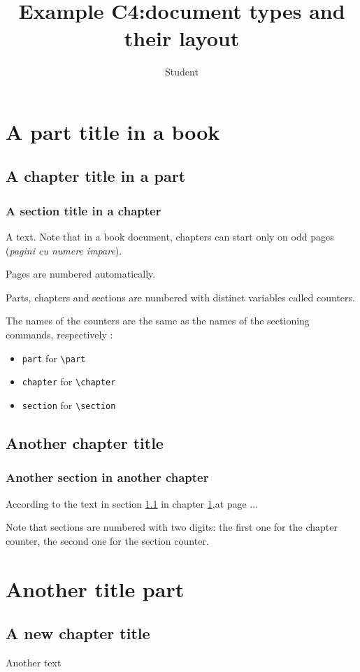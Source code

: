 \documentclass{book}
\title{Example C4:document types and their layout }
\author{Student}
\begin{document}
\maketitle
\tableofcontents
\part{A part title in a book}
\chapter{A chapter title in a part}\label{cha:et}
\section{A section title in a chapter}\label{sec:et}
A text. Note that in a book document, chapters can start only on odd pages (\emph{pagini cu numere impare}).\par
Pages are numbered automatically.\par
Parts, chapters and sections are numbered with distinct variables called counters.\par
The names of the counters are the same as the names of the sectioning commands, respectively :
\begin{itemize}
\item \verb+part+ for \verb+\part+
\item \verb+chapter+ for \verb+\chapter+
\item \verb+section+ for \verb+\section+
\end{itemize}
\chapter{Another chapter title}
\section{Another section in another chapter}
According to the text in section \ref{sec:et} in chapter \ref{cha:et},at page \pageref{cha:et} ...\par
Note that sections are numbered with two digits: the first one for the chapter counter, the second one for the section counter.
\part{Another title part}
\chapter{A new chapter title}
Another text
\end{document}
